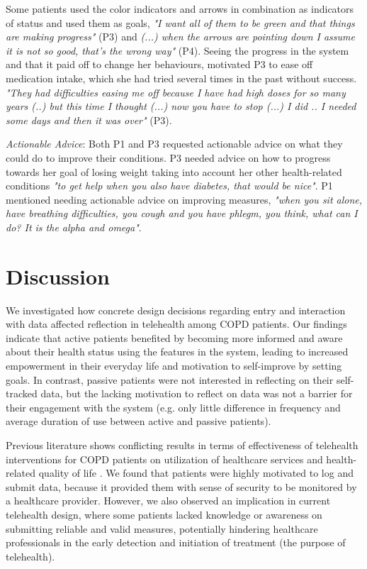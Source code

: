 Some patients used the color indicators and arrows in combination as indicators of status and used them as goals,  \textit{"I want all of them to be green and that things are making progress"} (P3) and \textit{(...) when the arrows are pointing down I assume it is not so good, that's the wrong way"} (P4). Seeing the progress in the system and that it paid off to change her behaviours, motivated P3 to ease off medication intake, which she had tried several times in the past without success. \textit{"They had difficulties easing me off because I have had high doses for so many years (..) but this time I thought (...) now you have to stop (...) I did .. I needed some days and then it was over"} (P3). 

\textit{Actionable Advice}: Both P1 and P3 requested actionable advice on what they could do to improve their conditions. P3 needed advice on how to progress towards her goal of losing weight taking into account her other health-related conditions \textit{"to get help when you also have diabetes, that would be nice"}. P1 mentioned needing actionable advice on improving measures, \textit{"when you sit alone, have breathing difficulties, you cough and you have phlegm, you think, what can I do? It is the alpha and omega"}. 

\section{Discussion} 
We investigated how concrete design decisions regarding entry and interaction with data affected reflection in telehealth among COPD patients. Our findings indicate that active patients benefited by becoming more informed and aware about their health status using the features in the system, leading to increased empowerment in their everyday life and motivation to self-improve by setting goals. In contrast, passive patients were not interested in reflecting on their self-tracked data, but the lacking motivation to reflect on data was not a barrier for their engagement with the system (e.g. only little difference in frequency and average duration of use between active and passive patients). 

Previous literature shows conflicting results in terms of effectiveness of telehealth interventions for COPD patients on utilization of healthcare services and health-related quality of life  \cite{pedone}. We found that patients were highly motivated to log and submit data, because it provided them with sense of security to be monitored by a healthcare provider. However, we also observed an implication in current telehealth design, where some patients lacked knowledge or awareness on submitting reliable and valid measures, potentially hindering healthcare professionals in the early detection and initiation of treatment (the purpose of telehealth). 

